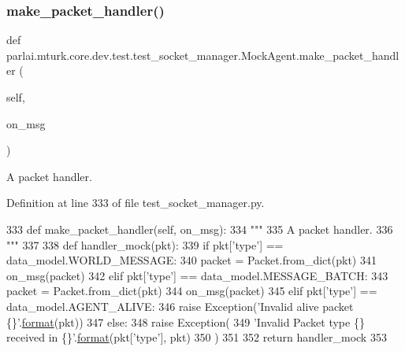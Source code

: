 \subsubsection{\texorpdfstring{make\+\_\+packet\+\_\+handler()}{make\_packet\_handler()}}
{\footnotesize\ttfamily def parlai.\+mturk.\+core.\+dev.\+test.\+test\+\_\+socket\+\_\+manager.\+Mock\+Agent.\+make\+\_\+packet\+\_\+handler (\begin{DoxyParamCaption}\item[{}]{self,  }\item[{}]{on\+\_\+msg }\end{DoxyParamCaption})}

\begin{DoxyVerb}A packet handler.
\end{DoxyVerb}
 

Definition at line 333 of file test\+\_\+socket\+\_\+manager.\+py.


\begin{DoxyCode}
333     \textcolor{keyword}{def }make\_packet\_handler(self, on\_msg):
334         \textcolor{stringliteral}{"""}
335 \textcolor{stringliteral}{        A packet handler.}
336 \textcolor{stringliteral}{        """}
337 
338         \textcolor{keyword}{def }handler\_mock(pkt):
339             \textcolor{keywordflow}{if} pkt[\textcolor{stringliteral}{'type'}] == data\_model.WORLD\_MESSAGE:
340                 packet = Packet.from\_dict(pkt)
341                 on\_msg(packet)
342             \textcolor{keywordflow}{elif} pkt[\textcolor{stringliteral}{'type'}] == data\_model.MESSAGE\_BATCH:
343                 packet = Packet.from\_dict(pkt)
344                 on\_msg(packet)
345             \textcolor{keywordflow}{elif} pkt[\textcolor{stringliteral}{'type'}] == data\_model.AGENT\_ALIVE:
346                 \textcolor{keywordflow}{raise} Exception(\textcolor{stringliteral}{'Invalid alive packet \{\}'}.\hyperlink{namespaceparlai_1_1chat__service_1_1services_1_1messenger_1_1shared__utils_a32e2e2022b824fbaf80c747160b52a76}{format}(pkt))
347             \textcolor{keywordflow}{else}:
348                 \textcolor{keywordflow}{raise} Exception(
349                     \textcolor{stringliteral}{'Invalid Packet type \{\} received in \{\}'}.\hyperlink{namespaceparlai_1_1chat__service_1_1services_1_1messenger_1_1shared__utils_a32e2e2022b824fbaf80c747160b52a76}{format}(pkt[\textcolor{stringliteral}{'type'}], pkt)
350                 )
351 
352         \textcolor{keywordflow}{return} handler\_mock
353 
\end{DoxyCode}
\mbox{\label{classparlai_1_1mturk_1_1core_1_1dev_1_1test_1_1test__socket__manager_1_1MockAgent_a1eeabaf756b6545e416829d002778006}} 
